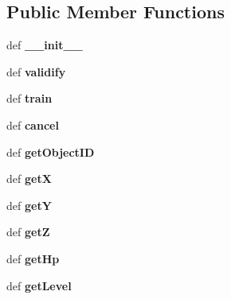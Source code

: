 \subsection*{Public Member Functions}
\begin{CompactItemize}
\item 
\hypertarget{classGameObject_1_1Building_eb6045358dab03e17c6ba476b3a46588}{
def \textbf{\_\-\_\-init\_\-\_\-}}
\label{classGameObject_1_1Building_eb6045358dab03e17c6ba476b3a46588}

\item 
\hypertarget{classGameObject_1_1Building_daeb682b33b8a34e1bc5957c712e73b4}{
def \textbf{validify}}
\label{classGameObject_1_1Building_daeb682b33b8a34e1bc5957c712e73b4}

\item 
\hypertarget{classGameObject_1_1Building_14f30b920edbeac55eaae511820abfcd}{
def \textbf{train}}
\label{classGameObject_1_1Building_14f30b920edbeac55eaae511820abfcd}

\item 
\hypertarget{classGameObject_1_1Building_81ec3da0991b30fc87e153d71cc0b3d5}{
def \textbf{cancel}}
\label{classGameObject_1_1Building_81ec3da0991b30fc87e153d71cc0b3d5}

\item 
\hypertarget{classGameObject_1_1Building_659d12a77cc1ac007f5fe185ec51533a}{
def \textbf{getObjectID}}
\label{classGameObject_1_1Building_659d12a77cc1ac007f5fe185ec51533a}

\item 
\hypertarget{classGameObject_1_1Building_2a15365dc0fb769174320a9b23a67ed8}{
def \textbf{getX}}
\label{classGameObject_1_1Building_2a15365dc0fb769174320a9b23a67ed8}

\item 
\hypertarget{classGameObject_1_1Building_c10cc24e6b78b64cffde90eff531334d}{
def \textbf{getY}}
\label{classGameObject_1_1Building_c10cc24e6b78b64cffde90eff531334d}

\item 
\hypertarget{classGameObject_1_1Building_a4296ec82731efae607649fa52ab7319}{
def \textbf{getZ}}
\label{classGameObject_1_1Building_a4296ec82731efae607649fa52ab7319}

\item 
\hypertarget{classGameObject_1_1Building_e9dffb5ac8c59acc6beb85f82826befc}{
def \textbf{getHp}}
\label{classGameObject_1_1Building_e9dffb5ac8c59acc6beb85f82826befc}

\item 
\hypertarget{classGameObject_1_1Building_aa320a6996c96f11a159181f140b9d93}{
def \textbf{getLevel}}
\label{classGameObject_1_1Building_aa320a6996c96f11a159181f140b9d93}


\end{CompactItemize}
